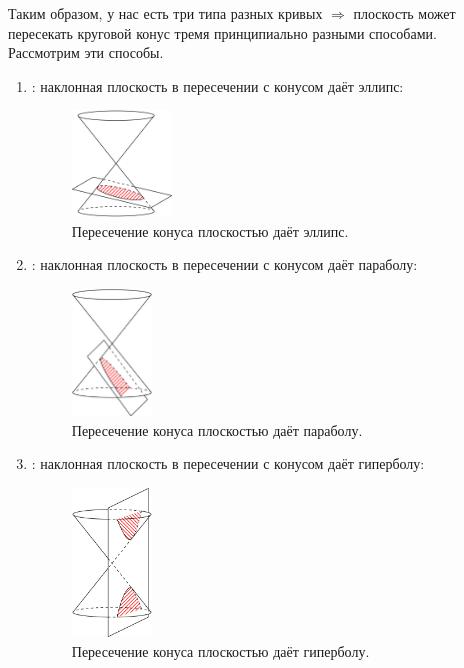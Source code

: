 \documentclass[12pt]{article}
\theoremstyle{definition}
\begin{document}
Таким образом, у нас есть три типа разных кривых $\Rightarrow$ плоскость может пересекать круговой конус тремя принципиально разными способами. Рассмотрим эти способы.

\begin{enumerate}[label=\arabic*)]
	\item {}: наклонная плоскость в пересечении с конусом даёт эллипс:
	\begin{figure}[H]
		\centering
		\includegraphics[width=0.25\textwidth]{ANGL1_5.png}
		\caption{Пересечение конуса плоскостью даёт эллипс.}
		\label{1_5}
	\end{figure}
	\item {}: наклонная плоскость в пересечении с конусом даёт параболу:
	\begin{figure}[H]
		\centering
		\includegraphics[width=0.2\textwidth]{ANGL1_6.png}
		\caption{Пересечение конуса плоскостью даёт параболу.}
		\label{1_6}
	\end{figure}
	\item {}: наклонная плоскость в пересечении с конусом даёт гиперболу:
	\begin{figure}[H]
		\centering
		\includegraphics[width=0.2\textwidth]{ANGL1_7.png}
		\caption{Пересечение конуса плоскостью даёт гиперболу.}
		\label{1_7}
	\end{figure}
\end{enumerate}
\end{document}
